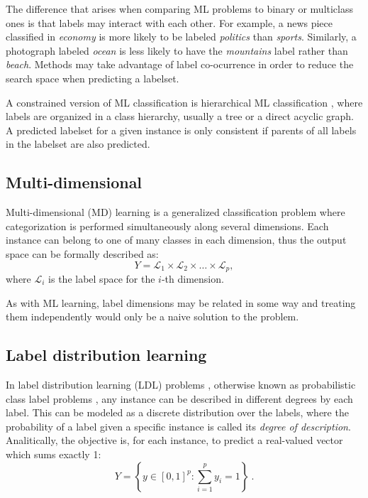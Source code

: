 \documentclass[
	fontsize=11pt, %
	twoside=false, %
	open=any, %
	secnumdepth=1, %
]{kaobook}
\begin{document}
The difference that arises when comparing ML problems to binary or multiclass ones is that labels may interact with each other. For example, a news piece classified in \emph{economy} is more likely to be labeled \emph{politics} than \emph{sports}. Similarly, a photograph labeled \emph{ocean} is less likely to have the \emph{mountains} label rather than \emph{beach}. Methods may take advantage of label co-ocurrence \cite{scumble} in order to reduce the search space when predicting a labelset. 


  A constrained version of ML classification is hierarchical ML classification \cite{hierarchical}, where labels are organized in a class hierarchy, usually a tree or a direct acyclic graph. A predicted labelset for a given instance is only consistent if parents of all labels in the labelset are also predicted.
  

\subsection{Multi-dimensional}
\label{sec:mdim}

Multi-dimensional (MD) learning \cite{mdc} is a generalized classification problem where categorization is performed simultaneously along several dimensions. Each instance can belong to one of many classes in each dimension, thus the output space can be formally described as:
\begin{equation}
  Y=\mathcal L_1\times\mathcal L_2\times\dots\times\mathcal L_p,
  \end{equation}
where $\mathcal L_i$ is the label space for the $i$-th dimension. 

As with ML learning, label dimensions may be related in some way and treating them independently would only be a naive solution to the problem.

\subsection{Label distribution learning}
\label{sec:ldl}

In label distribution learning (LDL) problems \cite{ldl}, otherwise known as probabilistic class label problems \cite{ldl-prob}, any instance can be described in different degrees by each label. This can be modeled as a discrete distribution over the labels, where the probability of a label given a specific instance is called its \emph{degree of description}. Analitically, the objective is, for each instance, to predict a real-valued vector which sums exactly 1:
\begin{equation}
  Y=\left\{y\in\left[0,1\right]^p:\sum_{i=1}^p y_i = 1\right\}~.
  \end{equation}
  
\end{document}
